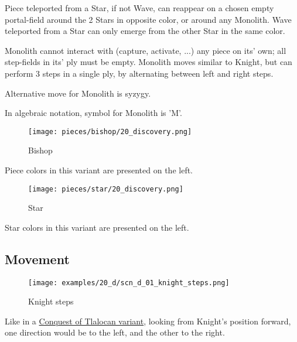 Piece teleported from a Star, if not Wave, can reappear on a chosen empty
portal-field around the 2 Stars in opposite color, or around any Monolith.
Wave teleported from a Star can only emerge from the other Star in the same
color.

Monolith cannot interact with (capture, activate, ...) any piece on its' own;
all step-fields in its' ply must be empty. Monolith moves similar to Knight,
but can perform 3 steps in a single ply, by alternating between left and right
steps.

Alternative move for Monolith is syzygy.

In algebraic notation, symbol for Monolith is 'M'.

\clearpage %

\noindent
\begin{wrapfigure}[2]{l}{0.4\textwidth}
\centering
\texttt{[image: pieces/bishop/20\_discovery.png]}
\caption{Bishop}
\label{fig:bishop/20_discovery}
\end{wrapfigure}
Piece colors in this variant are presented on the left.

\vspace*{0.30\textheight}
\noindent
\begin{wrapfigure}[2]{l}{0.4\textwidth}
\centering
\texttt{[image: pieces/star/20\_discovery.png]}
\caption{Star}
\label{fig:star/20_discovery}
\end{wrapfigure}
Star colors in this variant are presented on the left.

\clearpage %

\subsection*{Movement}

\vspace*{-0.3\baselineskip}
\noindent
\begin{wrapfigure}[4]{l}{0.35\textwidth}
\centering
\texttt{[image: examples/20\_d/scn\_d\_01\_knight\_steps.png]}
\caption{Knight steps}
\label{fig:scn_d_01_knight_steps}
\end{wrapfigure}
Like in a \hyperref[fig:scn_cot_10_knight_directions]{Conquest of Tlalocan variant},
looking from Knight's position forward, one direction
would be to the left, and the other to the right.

